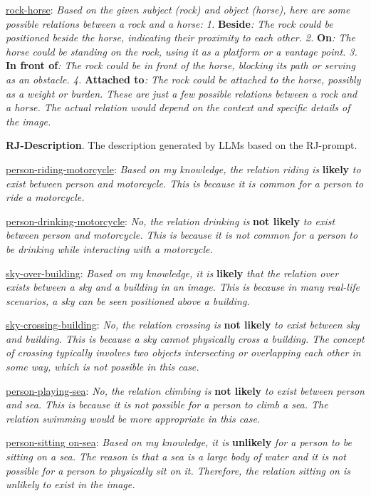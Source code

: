 \underline{rock-horse}: \textit{Based on the given subject (rock) and object (horse), here are some possible relations between a rock and a horse: 1.} \textbf{Beside}\textit{: The rock could be positioned beside the horse, indicating their proximity to each other. 2.} \textbf{On}\textit{: The horse could be standing on the rock, using it as a platform or a vantage point. 3.} \textbf{In front of}\textit{: The rock could be in front of the horse, blocking its path or serving as an obstacle. 4.} \textbf{Attached to}\textit{: The rock could be attached to the horse, possibly as a weight or burden. These are just a few possible relations between a rock and a horse. The actual relation would depend on the context and specific details of the image.}

\noindent \textbf{RJ-Description}.
The description generated by LLMs based on the RJ-prompt.

\underline{person-riding-motorcycle}: \textit{Based on my knowledge, the relation riding is} \textbf{likely} \textit{to exist between person and motorcycle. This is because it is common for a person to ride a motorcycle.}

\underline{person-drinking-motorcycle}: \textit{No, the relation drinking is} \textbf{not likely} \textit{to exist between person and motorcycle. This is because it is not common for a person to be drinking while interacting with a motorcycle.}

\underline{sky-over-building}: \textit{Based on my knowledge, it is} \textbf{likely} \textit{that the relation over exists between a sky and a building in an image. This is because in many real-life scenarios, a sky can be seen positioned above a building.}

\underline{sky-crossing-building}: \textit{No, the relation crossing is} \textbf{not likely} \textit{to exist between sky and building. This is because a sky cannot physically cross a building. The concept of crossing typically involves two objects intersecting or overlapping each other in some way, which is not possible in this case.}

\underline{person-playing-sea}: \textit{No, the relation climbing is} \textbf{not likely} \textit{to exist between person and sea. This is because it is not possible for a person to climb a sea. The relation swimming would be more appropriate in this case.}

\underline{person-sitting on-sea}: \textit{Based on my knowledge, it is} \textbf{unlikely} \textit{for a person to be sitting on a sea. The reason is that a sea is a large body of water and it is not possible for a person to physically sit on it. Therefore, the relation sitting on is unlikely to exist in the image.}

